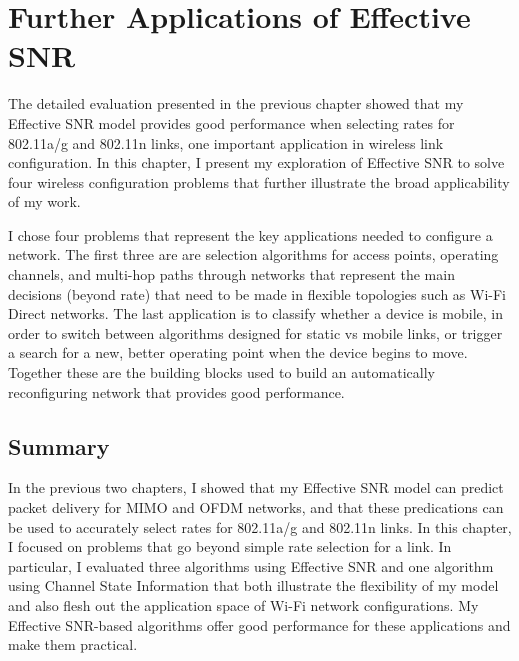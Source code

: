 \ifx\mainfile\undefined

\setcounter{chapter}{7} %
\fi

\cleardoublepage
\chapter{Further Applications of Effective SNR}
\label{chap:applications}

The detailed evaluation presented in the previous chapter showed that my Effective SNR model provides good performance when selecting rates for 802.11a/g and 802.11n links, one important application in wireless link configuration. In this chapter, I present my exploration of Effective SNR to solve four wireless configuration problems that further illustrate the broad applicability of my work.

I chose four problems that represent the key applications needed to configure a network. The first three are are selection algorithms for access points, operating channels, and multi-hop paths through networks that represent the main decisions (beyond rate) that need to be made in flexible topologies such as Wi-Fi Direct networks. The last application is to classify whether a device is mobile, in order to switch between algorithms designed for static vs mobile links, or trigger a search for a new, better operating point when the device begins to move. Together these are the building blocks used to build an automatically reconfiguring network that provides good performance.






\section{Summary}
In the previous two chapters, I showed that my Effective SNR model can predict packet delivery for MIMO and OFDM networks, and that these predications can be used to accurately select rates for 802.11a/g and 802.11n links. In this chapter, I focused on problems that go beyond simple rate selection for a link. In particular, I evaluated three algorithms using Effective SNR and one algorithm using Channel State Information that both illustrate the flexibility of my model and also flesh out the application space of Wi-Fi network configurations. My Effective SNR-based algorithms offer good performance for these applications and make them practical.

